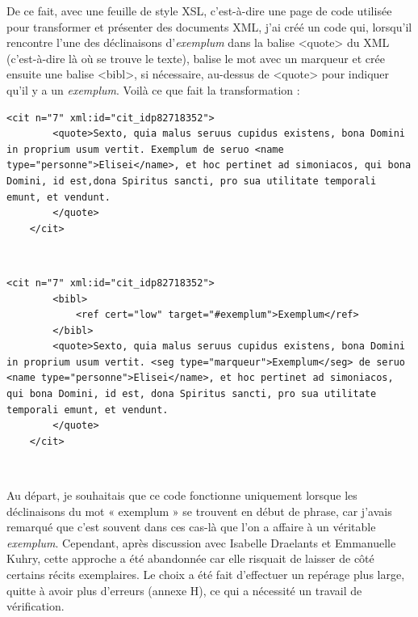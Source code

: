 De ce fait, avec une feuille de style XSL, c'est-à-dire une page de code utilisée pour transformer et présenter des documents XML, j'ai créé un code qui, lorsqu'il rencontre l'une des déclinaisons d'\textit{exemplum} dans la balise <quote> du XML (c'est-à-dire là où se trouve le texte), balise le mot avec un marqueur et crée ensuite une balise <bibl>, si nécessaire, au-dessus de <quote> pour indiquer qu'il y a un \textit{exemplum}. Voilà ce que fait la transformation : \\

\begin{lstlisting}[breaklines=true]
	<cit n="7" xml:id="cit_idp82718352">
		<quote>Sexto, quia malus seruus cupidus existens, bona Domini in proprium usum vertit. Exemplum de seruo <name type="personne">Elisei</name>, et hoc pertinet ad simoniacos, qui bona Domini, id est,dona Spiritus sancti, pro sua utilitate temporali emunt, et vendunt.
		</quote>
	</cit>
\end{lstlisting}

\

\begin{lstlisting}[breaklines=true]
	<cit n="7" xml:id="cit_idp82718352">
		<bibl>
			<ref cert="low" target="#exemplum">Exemplum</ref>
		</bibl>
		<quote>Sexto, quia malus seruus cupidus existens, bona Domini in proprium usum vertit. <seg type="marqueur">Exemplum</seg> de seruo <name type="personne">Elisei</name>, et hoc pertinet ad simoniacos, qui bona Domini, id est, dona Spiritus sancti, pro sua utilitate temporali emunt, et vendunt.
		</quote>
	</cit>
\end{lstlisting}

\

Au départ, je souhaitais que ce code fonctionne uniquement lorsque les déclinaisons du mot « exemplum » se trouvent en début de phrase, car j'avais remarqué que c'est souvent dans ces cas-là que l'on a affaire à un véritable \textit{exemplum}. Cependant, après discussion avec Isabelle Draelants et Emmanuelle Kuhry, cette approche a été abandonnée car elle risquait de laisser de côté certains récits exemplaires. Le choix a été fait d'effectuer un repérage plus large, quitte à avoir plus d'erreurs (annexe H), ce qui a nécessité un travail de vérification.

